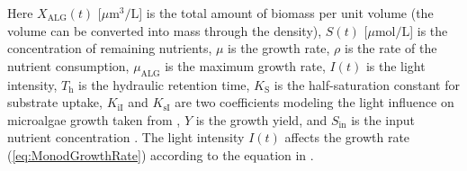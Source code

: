 \documentclass[lettersize,journal]{IEEEtran}
\begin{document}
Here $X_{\text{ALG}}(t)$ [$\mu \text{m}^3/\text{L}$] is the total amount of biomass per unit volume (the volume can be converted into mass through the density), $S(t)$ [$\mu \text{mol}/\text{L}$] is the concentration of remaining nutrients, $\mu$ is the growth rate, $\rho$ is the rate of the nutrient consumption, $\mu_{\text{ALG}}$ is the maximum growth rate, $I(t)$ is the light intensity, $T_{\text{h}}$ is the hydraulic retention time, $K_{\text{S}}$ is the half-saturation constant for substrate uptake, $K_{\text{iI}}$ and $K_{\text{sI}}$ are two coefficients modeling the light influence on microalgae growth taken from \cite{bernard2011hurdles}, $Y$ is the growth yield, and $S_{\text{in}}$ is the input nutrient concentration \cite{vatcheva2006experiment}. The light intensity $I(t)$ affects the growth rate (\ref{eq:MonodGrowthRate}) according to the equation in \cite{bernard2011hurdles}. 
\end{document}
